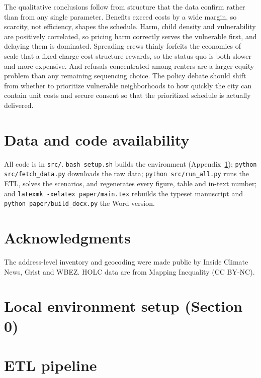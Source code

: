 \documentclass[11pt]{article}
\begin{document}
The qualitative conclusions follow from structure that the data confirm rather than from any single
parameter. Benefits exceed costs by a wide margin, so scarcity, not efficiency, shapes the schedule.
Harm, child density and vulnerability are positively correlated, so pricing harm correctly serves
the vulnerable first, and delaying them is dominated. Spreading crews thinly forfeits the economies
of scale that a fixed-charge cost structure rewards, so the status quo is both slower and more
expensive. And refusals concentrated among renters are a larger equity problem than any remaining
sequencing choice. The policy debate should shift from whether to prioritize vulnerable
neighborhoods to how quickly the city can contain unit costs and secure consent so that the
prioritized schedule is actually delivered.

\section*{Data and code availability}
All code is in \texttt{src/}. \texttt{bash setup.sh} builds the environment (Appendix~\ref{app:setup});
\texttt{python src/fetch\_data.py} downloads the raw data; \texttt{python src/run\_all.py} runs the
ETL, solves the scenarios, and regenerates every figure, table and in-text number; and
\texttt{latexmk -xelatex paper/main.tex} rebuilds the typeset manuscript and \texttt{python paper/build\_docx.py} the Word version.

\section*{Acknowledgments}
The address-level inventory and geocoding were made public by Inside Climate News, Grist and WBEZ.
HOLC data are from Mapping Inequality (CC BY-NC).




\appendix
\section{Local environment setup (Section 0)}\label{app:setup}


\section{ETL pipeline}\label{app:etl}

\end{document}
